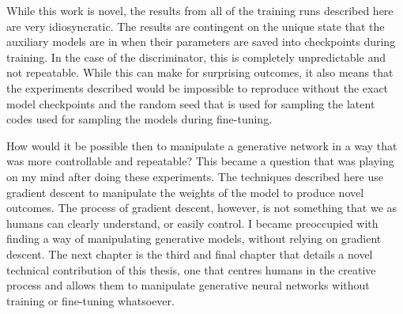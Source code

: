 While this work is novel, the results from all of the training runs described here are very idiosyncratic. 
The results are contingent on the unique state that the auxiliary models are in when their parameters are saved into checkpoints during training. 
In the case of the discriminator, this is completely unpredictable and not repeatable. 
While this can make for surprising outcomes, it also means that the experiments described would be impossible to reproduce without the exact model checkpoints and the random seed that is used for sampling the latent codes used for sampling the models during fine-tuning.

How would it be possible then to manipulate a generative network in a way that was more controllable and repeatable?
This became a question that was playing on my mind after doing these experiments. 
The techniques described here use gradient descent to manipulate the weights of the model to produce novel outcomes. 
The process of gradient descent, however, is not something that we as humans can clearly understand, or easily control.
I became preoccupied with finding a way of manipulating generative models, without relying on gradient descent. 
The next chapter is the third and final chapter that details a novel technical contribution of this thesis, one that centres humans in the creative process and allows them to manipulate generative neural networks without training or fine-tuning whatsoever.
